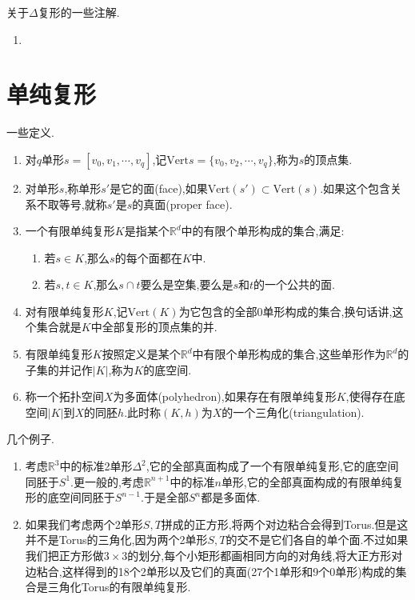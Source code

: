 关于$\Delta$复形的一些注解.
\begin{enumerate}
	\item 
\end{enumerate}



\newpage
\section{单纯复形}

一些定义.
\begin{enumerate}
	\item 对$q$单形$s=[v_0,v_1,\cdots,v_q]$,记$\mathrm{Vert}{s}=\{v_0,v_2,\cdots,v_q\}$,称为$s$的顶点集.
	\item 对单形$s$,称单形$s'$是它的面(face),如果$\mathrm{Vert}(s')\subset\mathrm{Vert}(s)$.如果这个包含关系不取等号,就称$s'$是$s$的真面(proper face).
	\item 一个有限单纯复形$K$是指某个$\mathbb{R}^d$中的有限个单形构成的集合,满足:
	\begin{enumerate}
		\item 若$s\in K$,那么$s$的每个面都在$K$中.
		\item 若$s,t\in K$,那么$s\cap t$要么是空集,要么是$s$和$t$的一个公共的面.
	\end{enumerate}
    \item 对有限单纯复形$K$,记$\mathrm{Vert}(K)$为它包含的全部0单形构成的集合,换句话讲,这个集合就是$K$中全部复形的顶点集的并.
    \item 有限单纯复形$K$按照定义是某个$\mathbb{R}^d$中有限个单形构成的集合,这些单形作为$\mathbb{R}^d$的子集的并记作$|K|$,称为$K$的底空间.
    \item 称一个拓扑空间$X$为多面体(polyhedron),如果存在有限单纯复形$K$,使得存在底空间$|K|$到$X$的同胚$h$.此时称$(K,h)$为$X$的一个三角化(triangulation).
\end{enumerate}

几个例子.
\begin{enumerate}
	\item 考虑$\mathbb{R}^3$中的标准2单形$\Delta^2$,它的全部真面构成了一个有限单纯复形,它的底空间同胚于$S^1$.更一般的,考虑$\mathbb{R}^{n+1}$中的标准$n$单形,它的全部真面构成的有限单纯复形的底空间同胚于$S^{n-1}$.于是全部$S^n$都是多面体.
	\item 如果我们考虑两个2单形$S,T$拼成的正方形,将两个对边粘合会得到Torus.但是这并不是Torus的三角化,因为两个2单形$S,T$的交不是它们各自的单个面.不过如果我们把正方形做$3\times3$的划分,每个小矩形都画相同方向的对角线,将大正方形对边粘合,这样得到的18个2单形以及它们的真面(27个1单形和9个0单形)构成的集合是三角化Torus的有限单纯复形.
\end{enumerate}

